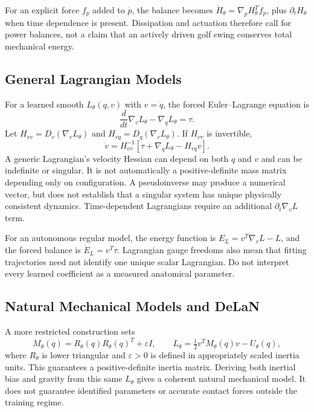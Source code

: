 For an explicit force $f_p$ added to $\dot p$, the balance becomes $\dot H_\theta=\nabla_pH_\theta^Tf_p$, plus $\partial_tH_\theta$ when time dependence is present. Dissipation and actuation therefore call for power balances, not a claim that an actively driven golf swing conserves total mechanical energy.

\subsection{General Lagrangian Models}

For a learned smooth $L_\theta(q,v)$ with $v=\dot q$, the forced Euler--Lagrange equation is
\begin{equation}
\frac{d}{dt}\nabla_vL_\theta-\nabla_qL_\theta=\tau.
\label{eq:lnn_euler_lagrange}
\end{equation}
Let $H_{vv}=D_v(\nabla_vL_\theta)$ and $H_{vq}=D_q(\nabla_vL_\theta)$. If $H_{vv}$ is invertible,
\begin{equation}
\dot v=H_{vv}^{-1}\left[\tau+\nabla_qL_\theta-H_{vq}v\right].
\end{equation}
A generic Lagrangian's velocity Hessian can depend on both $q$ and $v$ and can be indefinite or singular. It is not automatically a positive-definite mass matrix depending only on configuration. A pseudoinverse may produce a numerical vector, but does not establish that a singular system has unique physically consistent dynamics. Time-dependent Lagrangians require an additional $\partial_t\nabla_vL$ term.

For an autonomous regular model, the energy function is $E_L=v^T\nabla_vL-L$, and the forced balance is $\dot E_L=v^T\tau$. Lagrangian gauge freedoms also mean that fitting trajectories need not identify one unique scalar Lagrangian. Do not interpret every learned coefficient as a measured anatomical parameter.

\subsection{Natural Mechanical Models and DeLaN}

A more restricted construction sets
\begin{equation}
M_\theta(q)=R_\theta(q)R_\theta(q)^T+\varepsilon I,
\qquad L_\theta=\tfrac12v^TM_\theta(q)v-U_\theta(q),
\label{eq:delan_mass}
\end{equation}
where $R_\theta$ is lower triangular and $\varepsilon>0$ is defined in appropriately scaled inertia units. This guarantees a positive-definite inertia matrix. Deriving both inertial bias and gravity from this same $L_\theta$ gives a coherent natural mechanical model. It does not guarantee identified parameters or accurate contact forces outside the training regime.

